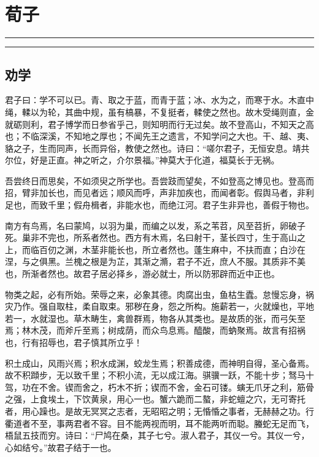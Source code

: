 \documentclass[]{article}
\date{}
\begin{document}
\hypertarget{header-n0}{%
\section{荀子}\label{header-n0}}

\begin{center}\rule{0.5\linewidth}{\linethickness}\end{center}

\tableofcontents

\begin{center}\rule{0.5\linewidth}{\linethickness}\end{center}

\hypertarget{header-n10}{%
\subsection{劝学}\label{header-n10}}

君子曰：学不可以已。青、取之于蓝，而青于蓝；冰、水为之，而寒于水。木直中绳，輮以为轮，其曲中规，虽有槁暴，不复挺者，輮使之然也。故木受绳则直，金就砺则利，君子博学而日参省乎己，则知明而行无过矣。故不登高山，不知天之高也；不临深溪，不知地之厚也；不闻先王之遗言，不知学问之大也。干、越、夷、貉之子，生而同声，长而异俗，教使之然也。诗曰：``嗟尔君子，无恒安息。靖共尔位，好是正直。神之听之，介尔景福。''神莫大于化道，福莫长于无祸。

吾尝终日而思矣，不如须臾之所学也。吾尝跂而望矣，不如登高之博见也。登高而招，臂非加长也，而见者远；顺风而呼，声非加疾也，而闻者彰。假舆马者，非利足也，而致千里；假舟楫者，非能水也，而绝江河。君子生非异也，善假于物也。

南方有鸟焉，名曰蒙鸠，以羽为巢，而编之以发，系之苇苕，风至苕折，卵破子死。巢非不完也，所系者然也。西方有木焉，名曰射干，茎长四寸，生于高山之上，而临百仞之渊，木茎非能长也，所立者然也。蓬生麻中，不扶而直；白沙在涅，与之俱黑。兰槐之根是为芷，其渐之滫，君子不近，庶人不服。其质非不美也，所渐者然也。故君子居必择乡，游必就士，所以防邪辟而近中正也。

物类之起，必有所始。荣辱之来，必象其德。肉腐出虫，鱼枯生蠹。怠慢忘身，祸灾乃作。强自取柱，柔自取束。邪秽在身，怨之所构。施薪若一，火就燥也，平地若一，水就湿也。草木畴生，禽兽群焉，物各从其类也。是故质的张，而弓矢至焉；林木茂，而斧斤至焉；树成荫，而众鸟息焉。醯酸，而蚋聚焉。故言有招祸也，行有招辱也，君子慎其所立乎！

积土成山，风雨兴焉；积水成渊，蛟龙生焉；积善成德，而神明自得，圣心备焉。故不积蹞步，无以致千里；不积小流，无以成江海。骐骥一跃，不能十步；驽马十驾，功在不舍。锲而舍之，朽木不折；锲而不舍，金石可镂。螾无爪牙之利，筋骨之强，上食埃土，下饮黄泉，用心一也。蟹六跪而二螯，非蛇蟺之穴，无可寄托者，用心躁也。是故无冥冥之志者，无昭昭之明；无惛惛之事者，无赫赫之功。行衢道者不至，事两君者不容。目不能两视而明，耳不能两听而聪。螣蛇无足而飞，梧鼠五技而穷。诗曰：``尸鸠在桑，其子七兮。淑人君子，其仪一兮。其仪一兮，心如结兮。''故君子结于一也。
\end{document}
